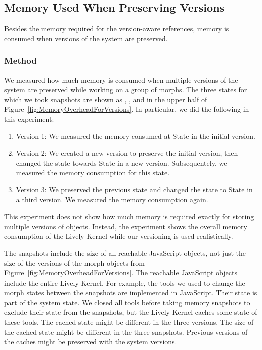 \subsection{Memory Used When Preserving Versions}

Besides the memory required for the version-aware references, memory is consumed when versions of the system are preserved.

\subsubsection{Method}
We measured how much memory is consumed when multiple versions of the system are preserved while working on a group of morphs.
The three states for which we took snapshots are shown as , , and  in the upper half of Figure~\ref{fig:MemoryOverheadForVersions}.
In particular, we did the following in this experiment:
\begin{enumerate}
    \item Version 1: We measured the memory consumed at State  in the initial version.
    \item Version 2: We created a new version to preserve the initial version, then changed the state towards State  in a new version. Subsequentely, we measured the memory consumption for this state.
    \item Version 3: We preserved the previous state and changed the state to State  in a third version. We measured the memory consumption again.
\end{enumerate}

This experiment does not show how much memory is required exactly for storing multiple versions of objects.
Instead, the experiment shows the overall memory consumption of the Lively Kernel while our versioning is used realistically.

The snapshots include the size of all reachable JavaScript objects, not just the size of the versions of the morph objects from Figure~\ref{fig:MemoryOverheadForVersions}.
The reachable JavaScript objects include the entire Lively Kernel.
For example, the tools we used to change the morph states between the snapshots are implemented in JavaScript.
Their state is part of the system state.
We closed all tools before taking memory snapshots to exclude their state from the snapshots, but the Lively Kernel caches some state of these tools.
The cached state might be different in the three versions.
The size of the cached state might be different in the three snapshots.
Previous versions of the caches might be preserved with the system versions.

